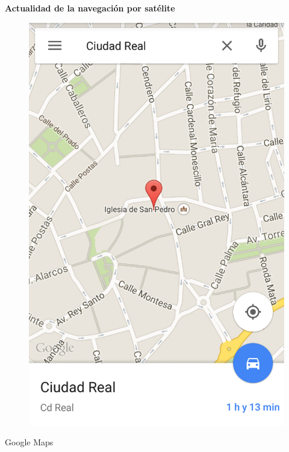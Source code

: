 \begin{slide}
  \begin{block}{\textbf{Actualidad de la navegación por satélite}}
  \begin{center}
    \begin{minipage}[b]{0.3\linewidth}
      \begin{center}
        \begin{figure}
          \includegraphics[height=0.6\textheight]{img/googlemaps.png}
        \end{figure}
        Google Maps
      \end{center}
    \end{minipage}
    \begin{minipage}[b]{0.3\linewidth}

\end{minipage}
\end{center}
\end{block}
\end{slide}
